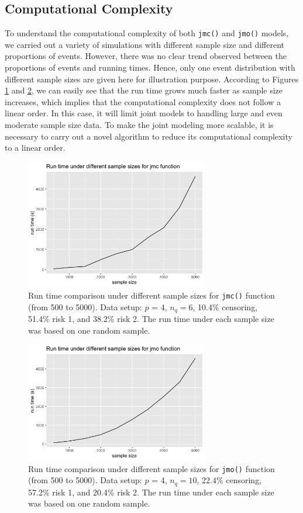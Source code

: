 \subsection{Computational Complexity}
To understand the computational complexity of both \texttt{jmc()} and \texttt{jmo()} models, we carried out a variety of simulations with different sample size and different proportions of events. However, there was no clear trend observed between the  proportions of events and running times. Hence, only one event distribution with different sample sizes are given here for illustration purpose.  According to Figures \ref{fig:f1} and \ref{fig:f2}, we can easily see that the run time grows much faster as sample size increases, which implies that the computational complexity does not follow a linear order. In this case, it will limit joint models to handling large and even moderate sample size data. To make the joint modeling more scalable, it is necessary to carry out a novel algorithm to reduce its computational complexity to a linear order.

\begin{figure}[!ht]
\includegraphics[width=8cm]{Fig1.png}
\centering
\caption{Run time comparison under different sample sizes for \texttt{jmc()} function (from 500 to 5000). Data setup: $p$ = 4, $n_q = 6$, 10.4\% censoring, 51.4\% risk 1, and 38.2\% risk 2. The run time under each sample size was based on one random sample.}
\label{fig:f1}
\end{figure}

\begin{figure}[!ht]
\includegraphics[width=8cm]{Fig2.png}
\centering
\caption{Run time comparison under different sample sizes for \texttt{jmo()} function (from 500 to 5000). Data setup: $p$ = 4, $n_q = 10$, 22.4\% censoring, 57.2\% risk 1, and 20.4\% risk 2. The run time under each sample size was based on one random sample.}
\label{fig:f2}
\end{figure}


